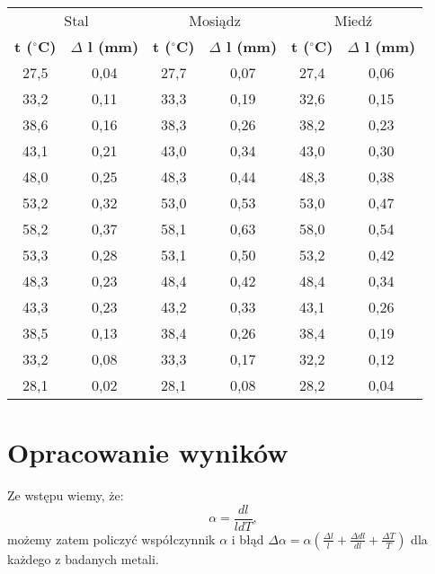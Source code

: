\documentclass[10pt,a4paper]{article}
\newcommand{\forceindent}{\leavevmode{\parindent=3em\indent}}
\begin{document}
\begin{center}
\begin{tabular}{|c|c||c|c||c|c|}
\multicolumn{2}{c}{Stal} & \multicolumn{2}{c}{Mosiądz} & \multicolumn{2}{c}{Miedź}\\
\hhline{|=|==|==|=|}
\textbf{t ($^{\circ}$C)} & \textbf{$\Delta$ l (mm)} & \textbf{t ($^{\circ}$C)} & \textbf{$\Delta$ l (mm)} & \textbf{t ($^{\circ}$C)} & \textbf{$\Delta$ l (mm)}\\
\hline
27,5 & 0,04 & 27,7 & 0,07 & 27,4 & 0,06\\
\hline
33,2 & 0,11 & 33,3 & 0,19 & 32,6 & 0,15\\
\hline
38,6 & 0,16 & 38,3 & 0,26 & 38,2 & 0,23\\
\hline
43,1 & 0,21 & 43,0 & 0,34 & 43,0 & 0,30\\
\hline
48,0 & 0,25 & 48,3 & 0,44 & 48,3 & 0,38\\
\hline
53,2 & 0,32 & 53,0 & 0,53 & 53,0 & 0,47\\
\hline
58,2 & 0,37 & 58,1 & 0,63 & 58,0 & 0,54\\
\hline
53,3 & 0,28 & 53,1 & 0,50 & 53,2 & 0,42\\
\hline
48,3 & 0,23 & 48,4 & 0,42 & 48,4 & 0,34\\
\hline
43,3 & 0,23 & 43,2 & 0,33 & 43,1 & 0,26\\
\hline
38,5 & 0,13 & 38,4 & 0,26 & 38,4 & 0,19\\
\hline
33,2 & 0,08 & 33,3 & 0,17 & 32,2 & 0,12\\
\hline
28,1 & 0,02 & 28,1 & 0,08 & 28,2 & 0,04\\
\hline

\end{tabular}
\end{center}

\section{Opracowanie wyników}
\forceindent Ze wstępu wiemy, że:
\begin{equation}
\alpha = \frac{dl}{l dT},
\end{equation}
możemy zatem policzyć współczynnik $\alpha$  i błąd $\Delta\alpha = \alpha(\frac{\Delta l}{l} + \frac{\Delta dl}{dl} + \frac{\Delta T}{T})$ dla każdego z badanych metali.\\
\end{document}

